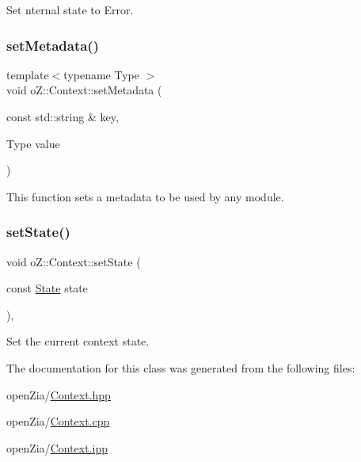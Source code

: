 Set nternal state to Error. 

\mbox{\label{classo_z_1_1_context_a7d5eb616d7daccab1f2cd8b3ae69c99c}} 
\subsubsection{\texorpdfstring{setMetadata()}{setMetadata()}}
{\footnotesize\ttfamily template$<$typename Type $>$ \\
void o\+Z\+::\+Context\+::set\+Metadata (\begin{DoxyParamCaption}\item[{const std\+::string \&}]{key,  }\item[{Type}]{value }\end{DoxyParamCaption})}



This function sets a metadata to be used by any module. 

\mbox{\label{classo_z_1_1_context_aa71b839188393f2328ad9f9c5da08004}} 
\subsubsection{\texorpdfstring{setState()}{setState()}}
{\footnotesize\ttfamily void o\+Z\+::\+Context\+::set\+State (\begin{DoxyParamCaption}\item[{const \mbox{\hyperlink{namespaceo_z_a356b278f7c65def0cae75fca8cae268e}{State}}}]{state }\end{DoxyParamCaption})\hspace{0.3cm}{\ttfamily [inline]}, {\ttfamily [noexcept]}}



Set the current context\textquotesingle{} state. 



The documentation for this class was generated from the following files\+:\begin{DoxyCompactItemize}
\item 
open\+Zia/\mbox{\hyperlink{_context_8hpp}{Context.\+hpp}}\item 
open\+Zia/\mbox{\hyperlink{_context_8cpp}{Context.\+cpp}}\item 
open\+Zia/\mbox{\hyperlink{_context_8ipp}{Context.\+ipp}}\end{DoxyCompactItemize}

